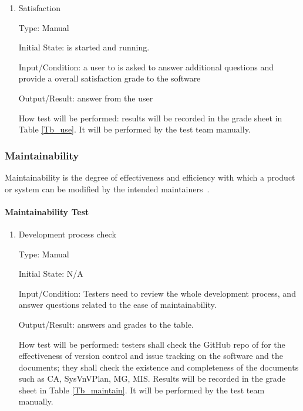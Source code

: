 \documentclass[12pt, titlepage]{article}
\begin{document}
\begin{enumerate}
\item{Satisfaction}

Type: Manual
					
Initial State: \progname{} is started and running.
					
Input/Condition: a user to \progname{} is asked to answer additional questions
and provide a overall satisfaction grade to the software
					
Output/Result: answer from the user
					
How test will be performed: results will be recorded in the grade sheet in Table
\ref{Tb_use}. It will be performed by the test team manually.

\end{enumerate}

\subsubsection{Maintainability}
\label{sec_Maintaintest} Maintainability is the degree of effectiveness and
efficiency with which a product or system can be modified by the intended
maintainers~\cite{ISO/IEC25010:2011}.

\paragraph{Maintainability Test}

\begin{enumerate}

\item{Development process check}

Type: Manual
					
Initial State: N/A
					
Input/Condition: Testers need to review the whole development process, and
answer questions related to the ease of maintainability.
					
Output/Result: answers and grades to the table.
					
How test will be performed: testers shall check the GitHub repo of \progname{}
for the effectiveness of version control and issue tracking on the software and
the documents; they shall check the existence and completeness of the documents
such as CA, SysVnVPlan, MG, MIS. Results will be recorded in the grade sheet in
Table \ref{Tb_maintain}. It will be performed by the test team manually.
\end{enumerate}
\end{document}
